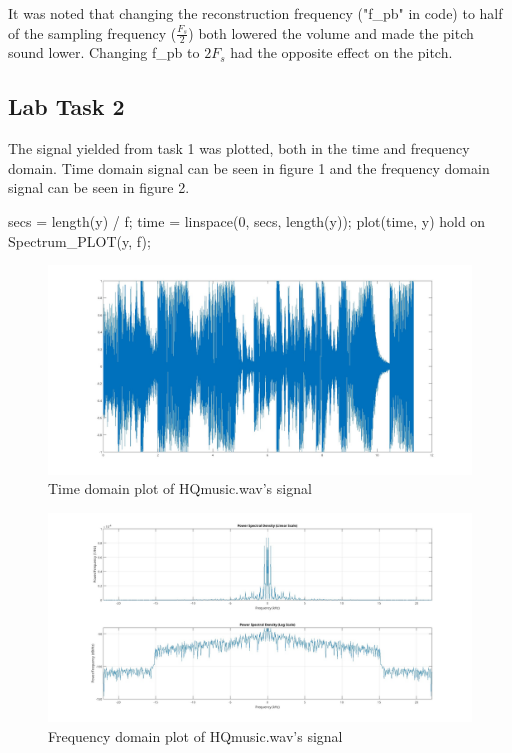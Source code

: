 \documentclass[a4paper,11pt]{article}
\begin{document}
It was noted that changing the reconstruction frequency ("f\_pb" in code) to half of the sampling frequency ($\frac{F_s}{2}$) both lowered the volume and made the pitch sound lower. Changing f\_pb to $2F_s$ had the opposite effect on the pitch.
\subsection{Lab Task 2}
The signal yielded from task 1 was plotted, both in the time and frequency domain. Time domain signal can be seen in figure 1 and the frequency domain signal can be seen in figure 2.

\begin{ffcode} 
secs = length(y) / f;
time = linspace(0, secs, length(y));
plot(time, y)
hold on
Spectrum_PLOT(y, f);
\end{ffcode}

\begin{figure}[H]
    \centering
    \hspace{-40pt}\includegraphics[scale = 0.2]{./images/Task2-PSD.jpg}
    \caption{Time domain plot of HQmusic.wav's signal}
    \label{fig:Task 2 Time domain}
\end{figure}

\begin{figure}[H]
    \centering
    \hspace{-60pt}\includegraphics[scale = 0.28]{./images/Task2-FFT.jpg}
    \caption{Frequency domain plot of HQmusic.wav's signal}
    \label{fig:Task 2 Freq. domain}
\end{figure}
\end{document}
